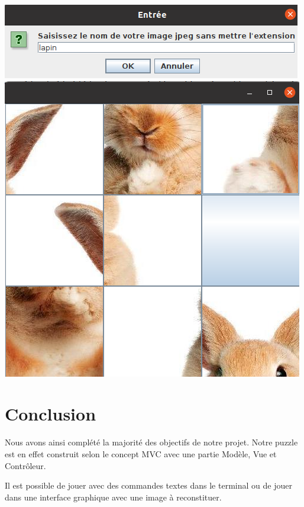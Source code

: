 \documentclass[french,12pt]{article}
\begin{document}
\begin{center}
	\includegraphics[scale=0.3]{img/titreImg.png}\\
	\includegraphics[scale=0.3]{img/imgDecoupee.png}
\end{center}

\section{Conclusion}

Nous avons ainsi complété la majorité des objectifs de notre projet.
Notre puzzle est en effet construit selon le concept MVC avec une partie Modèle, Vue et Contrôleur.

Il est possible de jouer avec des commandes textes dans le terminal ou de jouer dans une interface graphique avec une image à reconstituer.
\end{document}
